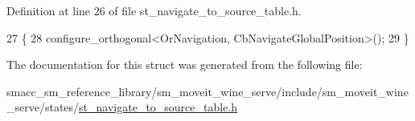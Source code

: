 Definition at line 26 of file st\+\_\+navigate\+\_\+to\+\_\+source\+\_\+table.\+h.


\begin{DoxyCode}
27         \{
28             configure\_orthogonal<OrNavigation, CbNavigateGlobalPosition>();
29         \}
\end{DoxyCode}


The documentation for this struct was generated from the following file\+:\begin{DoxyCompactItemize}
\item 
smacc\+\_\+sm\+\_\+reference\+\_\+library/sm\+\_\+moveit\+\_\+wine\+\_\+serve/include/sm\+\_\+moveit\+\_\+wine\+\_\+serve/states/\hyperlink{sm__moveit__wine__serve_2include_2sm__moveit__wine__serve_2states_2st__navigate__to__source__table_8h}{st\+\_\+navigate\+\_\+to\+\_\+source\+\_\+table.\+h}\end{DoxyCompactItemize}
